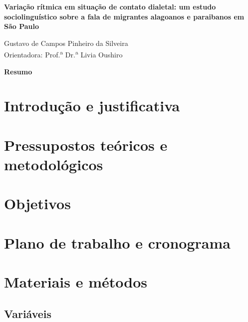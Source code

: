 \documentclass[
			a4paper,		%
			12pt,			%
			]{article}		%
\begin{document}
	
{ %
	\begin{center}
		{\bfseries\Large\sffamily
			Variação rítmica em situação de contato dialetal: um estudo sociolinguístico sobre a fala de migrantes alagoanos e paraibanos em São Paulo
		}
	\end{center}
}
	
	\vspace{0.35em}
{ %
	\begin{flushright} 
		Gustavo de Campos Pinheiro da Silveira \\ 
		\vspace{5pt}
		Orientadora: Prof.\textsuperscript{a} Dr.\textsuperscript{a} Livia Oushiro
	\end{flushright}

	\begin{center} 
	    {\bfseries\sffamily Resumo} \\ 
	\end{center}
	\blindtext \par
	\vspace{0.35em}
		
}

\section{Introdução e justificativa} \label{intro}

\section{Pressupostos teóricos e metodológicos} \label{pressup}

\section{Objetivos} \label{objetivos}

\section{Plano de trabalho e cronograma} \label{plano}
	
\section{Materiais e métodos} \label{metodo}

	\subsection{Variáveis} \label{variaveis}
\end{document}
